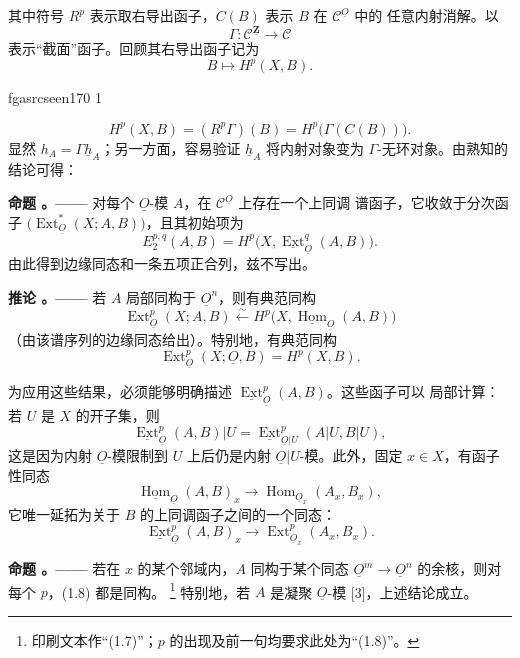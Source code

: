 \documentclass[12pt,twoside,openany]{book}
\numberwithin{equation}{section}
\newcommand{\fgaunitid}{unbound}
\newcommand{\src}[1]{%
  \phantomsection
  \hypertarget{src:\fgaunitid:#1}{}%
  \hypertarget{fga.\fgaunitid.p#1}{}%
  \ifcsname fgasrcseen#1\endcsname\else
    \expandafter\gdef\csname fgasrcseen#1\endcsname{1}%
    \hypertarget{src:#1}{}%
  \fi
  \marginpar{\raggedleft\footnotesize\sffamily #1}%
}
\newcommand{\Osh}{\underline{O}}
\newcommand{\Zsh}{\underline{\mathbf Z}}
\newcommand{\Ccat}{\mathcal C}
\newcommand{\Homsh}{\underline{\operatorname{Hom}}}
\newcommand{\Extsh}{\underline{\operatorname{Ext}}}
\newcommand{\hsh}{\underline{h}}
\newcommand{\fquote}[1]{“#1”}
\theoremstyle{plain}
\theoremstyle{definition}
\theoremstyle{remark}
\newcommand{\result}[2]{%
  \par\medskip\noindent\textbf{#1%
  \if\relax\detokenize{#2}\relax\else\space#2\fi。——}\enspace
}
\begin{document}
其中符号 $R^{p}$ 表示取右导出函子，$C(B)$ 表示 $B$ 在 $\Ccat^{\Osh}$ 中的
任意内射消解。以
\[
  \Gamma:\Ccat^{\Zsh}\longrightarrow\Ccat
\]
表示\fquote{截面}函子。回顾其右导出函子记为
\[
  B\longmapsto H^{p}(X,B).
\]

\src{170}
\begin{equation}\tag{1.3}
  H^{p}(X,B)=(R^{p}\Gamma)(B)=H^{p}\bigl(\Gamma(C(B))\bigr).
\end{equation}
显然 $h_A=\Gamma\hsh_A$；另一方面，容易验证 $\hsh_A$ 将内射对象变为
$\Gamma$-无环对象。由熟知的结论可得：

\result{命题}{1} 对每个 $\Osh$-模 $A$，在 $\Ccat^{\Osh}$ 上存在一个上同调
谱函子，它收敛于分次函子
$\bigl(\operatorname{Ext}_{\Osh}^{*}(X;A,B)\bigr)$，且其初始项为
\begin{equation}\tag{1.4}
  E_{2}^{p,q}(A,B)=H^{p}\bigl(X,\Extsh_{\Osh}^{q}(A,B)\bigr).
\end{equation}
由此得到边缘同态和一条五项正合列，兹不写出。

\result{推论}{1} 若 $A$ 局部同构于 $\Osh^{n}$，则有典范同构
\begin{equation}\tag{1.5}
  \operatorname{Ext}_{\Osh}^{p}(X;A,B)
  \overset{\sim}{\longleftarrow}
  H^{p}\bigl(X,\Homsh_{\Osh}(A,B)\bigr)
\end{equation}
（由该谱序列的边缘同态给出）。特别地，有典范同构
\begin{equation}\tag{1.6}
  \operatorname{Ext}_{\Osh}^{p}(X;\Osh,B)=H^{p}(X,B).
\end{equation}

为应用这些结果，必须能够明确描述 $\Extsh_{\Osh}^{p}(A,B)$。这些函子可以
局部计算：若 $U$ 是 $X$ 的开子集，则
\[
  \Extsh_{\Osh}^{p}(A,B)|U
  =\Extsh_{\Osh|U}^{p}(A|U,B|U),
\]
这是因为内射 $\Osh$-模限制到 $U$ 上后仍是内射 $\Osh|U$-模。此外，固定
$x\in X$，有函子性同态
\begin{equation}\tag{1.7}
  \Homsh_{\Osh}(A,B)_x
  \longrightarrow
  \operatorname{Hom}_{\Osh_x}(A_x,B_x),
\end{equation}
它唯一延拓为关于 $B$ 的上同调函子之间的一个同态：
\begin{equation}\tag{1.8}
  \Extsh_{\Osh}^{p}(A,B)_x
  \longrightarrow
  \operatorname{Ext}_{\Osh_x}^{p}(A_x,B_x).
\end{equation}

\result{命题}{2} 若在 $x$ 的某个邻域内，$A$ 同构于某个同态
$\Osh^{m}\longrightarrow\Osh^{n}$ 的余核，则对每个 $p$，(1.8) 都是同构。%
\footnote{印刷文本作“(1.7)”；$p$ 的出现及前一句均要求此处为“(1.8)”。}
特别地，若 $A$ 是凝聚 $\Osh$-模 [3]，上述结论成立。
\end{document}
